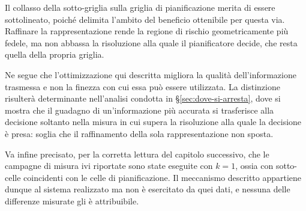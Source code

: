 Il collasso della sotto-griglia sulla griglia di pianificazione merita di essere sottolineato,
poiché delimita l'ambito del beneficio ottenibile per questa via. Raffinare la
rappresentazione rende la regione di rischio geometricamente più fedele, ma non abbassa la
risoluzione alla quale il pianificatore decide, che resta quella della propria griglia.

Ne segue che l'ottimizzazione qui descritta migliora la qualità dell'informazione trasmessa e
non la finezza con cui essa può essere utilizzata. La distinzione risulterà determinante
nell'analisi condotta in \S\ref{sec:dove-si-arresta}, dove si mostra che il guadagno di
un'informazione più accurata si trasferisce alla decisione soltanto nella misura in cui supera
la risoluzione alla quale la decisione è presa: soglia che il raffinamento della sola
rappresentazione non sposta.

Va infine precisato, per la corretta lettura del capitolo successivo, che le campagne di
misura ivi riportate sono state eseguite con $k=1$, ossia con sotto-celle coincidenti con le
celle di pianificazione. Il meccanismo descritto appartiene dunque al sistema realizzato ma
non è esercitato da quei dati, e nessuna delle differenze misurate gli è attribuibile.
